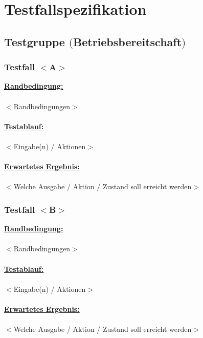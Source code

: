 
	\chapter{Testfallspezifikation}
	\section{Testgruppe $($Betriebsbereitschaft$)$}
	\subsection{Testfall $<$A$>$}
	\underline{\textbf{Randbedingung:}}
	\\
	\\
	$<$Randbedingungen$>$
	\\
	\\
	\underline{\textbf{Testablauf: }}
	\\
	\\
	$<$Eingabe(n) / Aktionen$>$
	\\
	\\
	\underline{\textbf{Erwartetes Ergebnis: }}
	\\
	\\
	$<$Welche Ausgabe / Aktion / Zustand soll erreicht werden$>$
	\subsection{Testfall $<$B$>$}
	\underline{\textbf{Randbedingung:}}
	\\
	\\
	$<$Randbedingungen$>$
	\\
	\\
	\underline{\textbf{Testablauf: }}
	\\
	\\
	$<$Eingabe(n) / Aktionen$>$
	\\
	\\
	\underline{\textbf{Erwartetes Ergebnis: }}
	\\
	\\
	$<$Welche Ausgabe / Aktion / Zustand soll erreicht werden$>$
